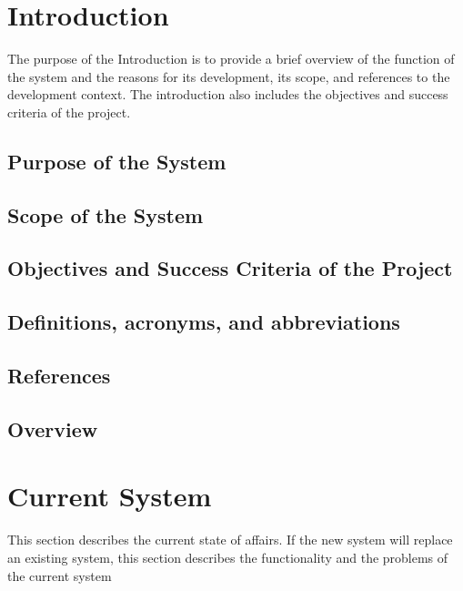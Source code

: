 \documentclass[a4paper,12pt]{scrartcl}
\newenvironment{subs}
{\adjustwidth{3em}{0pt}}
{\endadjustwidth}
\begin{document}
    \section{Introduction}
    The purpose of the Introduction is to provide a brief overview of the function of the system and the reasons for its development, its scope, and references to the development context. The introduction also includes the objectives and success criteria of the project.
    \begin{subs}
        \subsection{Purpose of the System}

        \subsection{Scope of the System}

        \subsection{Objectives and Success Criteria of the Project}

        \subsection{Definitions, acronyms, and abbreviations}

        \subsection{References}

        \subsection{Overview}
    \end{subs}


    \section{Current System}
    This section describes the current state of affairs. If the new system will replace an existing system, this section describes the functionality and the problems of the current system
\end{document}
